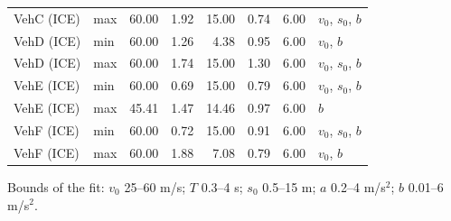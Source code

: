 \begin{table}[t]
\begin{tabular}{llrrrrrl}
VehC (ICE) & max & 60.00 & 1.92 & 15.00 & 0.74 & 6.00 & $v_0$, $s_0$, $b$ \\
VehD (ICE) & min & 60.00 & 1.26 & 4.38 & 0.95 & 6.00 & $v_0$, $b$ \\
VehD (ICE) & max & 60.00 & 1.74 & 15.00 & 1.30 & 6.00 & $v_0$, $s_0$, $b$ \\
VehE (ICE) & min & 60.00 & 0.69 & 15.00 & 0.79 & 6.00 & $v_0$, $s_0$, $b$ \\
VehE (ICE) & max & 45.41 & 1.47 & 14.46 & 0.97 & 6.00 & $b$ \\
VehF (ICE) & min & 60.00 & 0.72 & 15.00 & 0.91 & 6.00 & $v_0$, $s_0$, $b$ \\
VehF (ICE) & max & 60.00 & 1.88 & 7.08 & 0.79 & 6.00 & $v_0$, $b$ \\
\bottomrule
\end{tabular}
\par\smallskip
\parbox{\linewidth}{\footnotesize Bounds of the fit: $v_0$ 25--60 m/s; $T$ 0.3--4 s; $s_0$ 0.5--15 m; $a$ 0.2--4 m/s$^2$; $b$ 0.01--6 m/s$^2$.}
\end{table}
